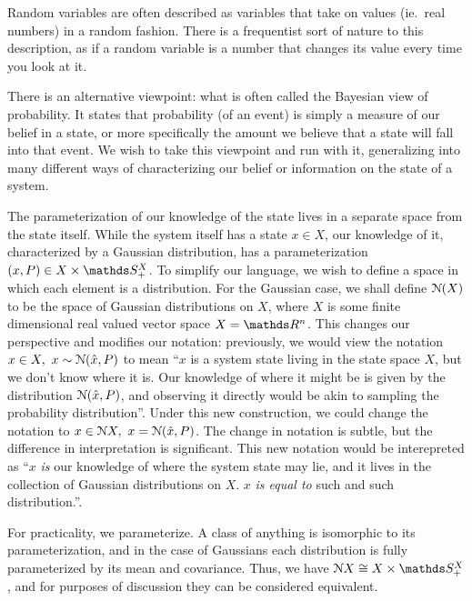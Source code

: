 Random variables are often described as variables that take on values (ie.\ real numbers) in a random fashion.
There is a frequentist sort of nature to this description, as if a random variable is a number that changes its value every time you look at it.


There is an alternative viewpoint: what is often called the Bayesian view of probability.
It states that probability (of an event) is simply a measure of our belief in a state, or more specifically the amount we believe that a state will fall into that event.
We wish to take this viewpoint and run with it, generalizing into many different ways of characterizing our belief or information on the state of a system.

The parameterization of our knowledge of the state lives in a separate space from the state itself.
While the system itself has a state $x\in X$, our knowledge of it, characterized by a Gaussian distribution, has a parameterization $(x,P)\in X\times \symmetric^X_+$.
To simplify our language, we wish to define a space in which each element is a distribution. For the Gaussian case, we shall define $\mathcal{N}(X)$ to be the space of Gaussian distributions on $X$, where $X$ is some finite dimensional real valued vector space $X=\reals^n$. This changes our perspective and modifies our notation: previously, we would view the notation $x\in X,\ x\sim \mathcal{N}(\hat{x}, P)$ to mean ``$x$ is a system state living in the state space $X$, but we don't know where it is. Our knowledge of where it might be is given by the distribution $\mathcal{N}(\hat{x}, P)$, and observing it directly would be akin to sampling the probability distribution''. Under this new construction, we could change the notation to $x\in \mathcal{N} X,\ x = \mathcal{N}(\hat{x}, P)$.
The change in notation is subtle, but the difference in interpretation is significant. This new notation would be interepreted as ``$x$ \emph{is} our knowledge of where the system state may lie, and it lives in the collection of Gaussian distributions on $X$. $x$ \emph{is equal to} such and such distribution.''.

For practicality, we parameterize. A class of anything is isomorphic to its parameterization, and in the case of Gaussians each distribution is fully parameterized by its mean and covariance. Thus, we have $\gaussian X \cong X\times \symmetric^X_+$, and for purposes of discussion they can be considered equivalent.

